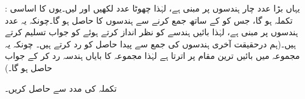:\quad 
یہاں بڑا عدد    چار ہندسوں پر مبنی ہے،  لہٰذا چھوٹا  عدد   لکھیں اور    لیں۔یوں  کا اساسی  تکملہ   ہو گا، جس کو  کے ساتھ جمع کرنے سے   ہندسوں کا     حاصل ہو گا۔چونکہ یہ عدد  ہندسوں پر مبنی ہے،  لہٰذا  بائیں ہندسے   کو نظر انداز کرتے ہوئے  کو جواب تسلیم کرتے ہیں۔(ہم درحقیقت آخری ہندسوں کی جمع سے پیدا حاصل  کو رد کرتے ہیں۔ چونکہ یہ مجموعہ میں بائیں ترین مقام پر اترتا ہے لہٰذا مجموعہ کا بایاں ہندسہ رد کر کے جواب حاصل ہو گا۔)
\begin{center}
\begin{otherlanguage}{english}
\quad\quad
{}
\end{otherlanguage}
\end{center}
تکملہ   کی مدد سے    حاصل کریں۔ 


